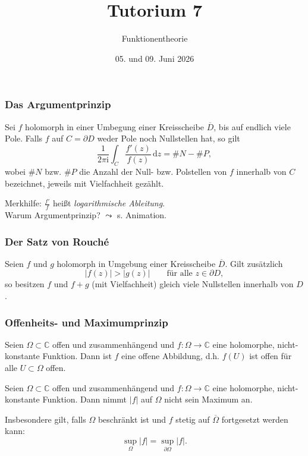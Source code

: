 \documentclass[10pt]{beamer}
\author[\url{https://fdf-uni.github.io/ft}]{}
\title{Tutorium 7}
\subtitle{\texorpdfstring{Funktionentheorie\vspace*{-1.5cm}}{Funktionentheorie}}
\date{05. und 09. Juni 2026}
\newcommand{\iu}{\mathrm{i}}
\begin{document}
\begin{frame}
	\titlepage
\end{frame}
\begin{frame}
	\frametitle{Das Argumentprinzip}
	\begin{theorem}
		Sei $f$ holomorph in einer Umbegung einer Kreisscheibe $\overline{D}$, bis auf endlich viele Pole.
		Falls $f$ auf $C = \partial D$ weder Pole noch Nullstellen hat, so gilt
		\[
			\frac{1}{2 \pi \iu} \int_{C} \frac{f'(z)}{f(z)} \,\mathrm{d}z = \# N - \# P,
		\]
		wobei $\# N$ bzw. $\# P$ die Anzahl der Null- bzw. Polstellen von $f$ innerhalb von $C$ bezeichnet, jeweils mit Vielfachheit gezählt.
	\end{theorem}
	\pause
	Merkhilfe: $\frac{f'}{f}$ heißt \emph{logarithmische Ableitung}.\\
	\pause
	Warum Argumentprinzip? \pause $\leadsto$ s. Animation.
\end{frame}
\begin{frame}
	\frametitle{Der Satz von Rouché}
	\pause
	\begin{theorem}
		Seien $f$ und $g$ holomorph in Umgebung einer Kreisscheibe $\overline{D}$.
		Gilt zusätzlich
		\[
			\lvert f(z) \rvert > \lvert g(z) \rvert \qquad \text{für alle } z \in \partial D,
		\]
		so besitzen $f$ und $f + g$ (mit Vielfachheit) gleich viele Nullstellen innerhalb von $D$.
	\end{theorem}
\end{frame}
\begin{frame}
	\frametitle{Offenheits- und Maximumprinzip}
	\pause
	\begin{theorem}
		Seien $\Omega \subset \mathbb{C}$ offen und zusammenhängend und $f \colon \Omega \to \mathbb{C}$ eine holomorphe, nicht-konstante Funktion.
		Dann ist $f$ eine offene Abbildung, d.h. $f(U)$ ist offen für alle $U \subset \Omega$ offen.
	\end{theorem}
	\pause
	\begin{theorem}[Maximumprinzip]
		Seien $\Omega \subset \mathbb{C}$ offen und zusammenhängend und $f \colon \Omega \to \mathbb{C}$ eine holomorphe, nicht-konstante Funktion.
		Dann nimmt $\lvert f \rvert$ auf $\Omega$ nicht sein Maximum an.

		Insbesondere gilt, falls $\Omega$ beschränkt ist und $f$ stetig auf $\overline{\Omega}$ fortgesetzt werden kann:
		\[
			\sup_{\Omega} \lvert f \rvert = \sup_{\partial \Omega} \lvert f \rvert.
		\]
	\end{theorem}
\end{frame}
\end{document}
